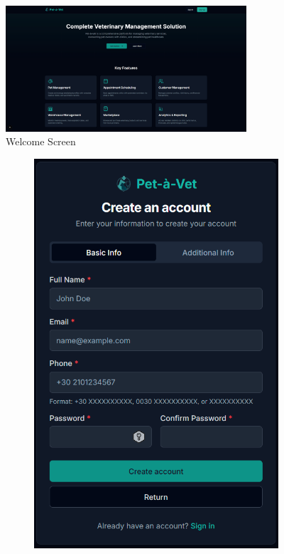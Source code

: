 \documentclass[12pt,a4paper,twoside]{book}
\begin{document}
\begin{figure}[H]
    \centering
    \includegraphics[width=0.8\textwidth]{Resources/Final UI/welcome-screen.png}
    \caption{Welcome Screen}\label{fig:welcome-screen}
\end{figure}

\begin{figure}[H]
    \centering
    \begin{subfigure}[b]{0.48\textwidth}
        \centering
        \includegraphics[width=\textwidth]{Resources/Final UI/sign-up.png}

\end{subfigure}
\end{figure}
\end{document}

